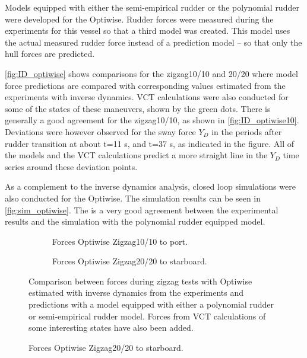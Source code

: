 Models equipped with either the semi-empirical rudder or the polynomial rudder were developed for the Optiwise. Rudder forces were measured during the experiments for this vessel so that a third model was created. This model uses the actual measured rudder force instead of a prediction model -- so that only the hull forces are predicted. 

\autoref{fig:ID_optiwise} shows comparisons for the zigzag10/10 and 20/20 where model force predictions are compared with corresponding values estimated from the experiments with inverse dynamics. VCT calculations were also conducted for some of the states of these maneuvers, shown by the green dots.
There is generally a good agreement for the zigzag10/10, as shown in \autoref{fig:ID_optiwise10}. Deviations were however observed for the sway force $Y_D$ in the periods after rudder transition at about t=11 s, and t=37 s, as indicated in the figure. All of the models and the VCT calculations predict a more straight line in the $Y_D$ time series around these deviation points. 

As a complement to the inverse dynamics analysis, closed loop simulations were also conducted for the Optiwise. The simulation results can be seen in \autoref{fig:sim_optiwise}. The is a very good agreement between the experimental results and the simulation with the polynomial rudder equipped model. 
\begin{figure}[h]
     \centering
     \begin{subfigure}[b]{\textwidth}
         \centering
         
        \caption{Forces Optiwise Zigzag10/10 to port.}
        \label{fig:ID_optiwise10}
     \end{subfigure}
     \vfill
     \begin{subfigure}[b]{\textwidth}
         
        \caption{Forces Optiwise Zigzag20/20 to starboard.}
        \label{fig:ID_optiwise_20}
     \end{subfigure}
        \caption{Comparison between forces during zigzag tests with Optiwise estimated with inverse dynamics from the experiments and predictions with a model equipped with either a polynomial rudder or semi-empirical rudder model. Forces from VCT calculations of some interesting states have also been added.}
        \label{fig:ID_optiwise}
\end{figure}

\begin{figure}[h]
    
    \caption{Forces Optiwise Zigzag20/20 to starboard.}
    \label{fig:ID_optiwise_20}
\end{figure}